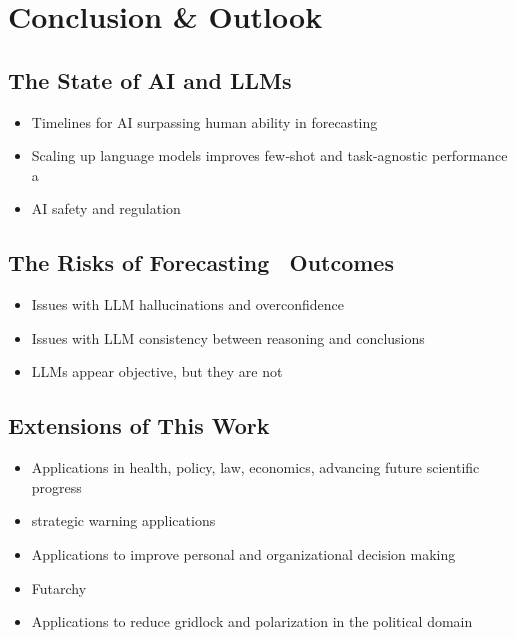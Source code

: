 \documentclass[12pt,a4paper]{article}
\begin{document}
\section*{Conclusion \& Outlook}
\subsection*{The State of AI and LLMs}
\begin{itemize}
  \item Timelines for AI surpassing human ability in forecasting 
  \item Scaling up language models improves few‑shot and task‑agnostic performance a
  \item AI safety and regulation
\end{itemize}
\subsection*{The Risks of Forecasting \DOMAINCAPITALIZED\ Outcomes}
\begin{itemize}
  \item Issues with LLM hallucinations and overconfidence
  \item Issues with LLM consistency between reasoning and conclusions
  \item LLMs appear objective, but they are not
\end{itemize}
\subsection*{Extensions of This Work}
\begin{itemize}
  \item Applications in health, policy, law, economics, advancing future scientific progress
  \item strategic warning applications 
  \item Applications to improve personal and organizational decision making
  \item Futarchy   
  \item Applications to reduce gridlock and polarization in the political domain
\end{itemize}
\clearpage
\printbibliography
\end{document}

